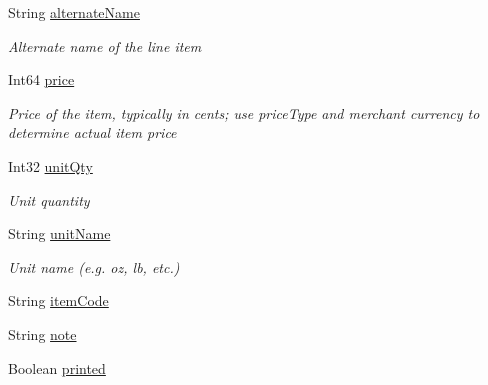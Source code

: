 \begin{DoxyCompactItemize}
String \hyperlink{classcom_1_1clover_1_1sdk_1_1v3_1_1order_1_1_line_item_ad92d1b639e56f340f573b3d8bd606bc2}{alternate\+Name}
\begin{DoxyCompactList}\small\item\em Alternate name of the line item \end{DoxyCompactList}\item 
Int64 \hyperlink{classcom_1_1clover_1_1sdk_1_1v3_1_1order_1_1_line_item_a6cc5649f0e04eadb9a99745e5234ba59}{price}
\begin{DoxyCompactList}\small\item\em Price of the item, typically in cents; use price\+Type and merchant currency to determine actual item price \end{DoxyCompactList}\item 
Int32 \hyperlink{classcom_1_1clover_1_1sdk_1_1v3_1_1order_1_1_line_item_a92ddb3af9ce72f7fb31afbef9a969e32}{unit\+Qty}
\begin{DoxyCompactList}\small\item\em Unit quantity \end{DoxyCompactList}\item 
String \hyperlink{classcom_1_1clover_1_1sdk_1_1v3_1_1order_1_1_line_item_a6dc74dc1423afa31c2be208f4ab525d8}{unit\+Name}
\begin{DoxyCompactList}\small\item\em Unit name (e.\+g. oz, lb, etc.) \end{DoxyCompactList}\item 
String \hyperlink{classcom_1_1clover_1_1sdk_1_1v3_1_1order_1_1_line_item_a0b8291a33c76f6f1489156e7eaf58c3a}{item\+Code}
\item 
String \hyperlink{classcom_1_1clover_1_1sdk_1_1v3_1_1order_1_1_line_item_a517fcf34f1f00f709c5288fd9819b11e}{note}
\item 
Boolean \hyperlink{classcom_1_1clover_1_1sdk_1_1v3_1_1order_1_1_line_item_a5fe8c21f2e556a6c8242fa10bb88e8a6}{printed}

\end{DoxyCompactItemize}
